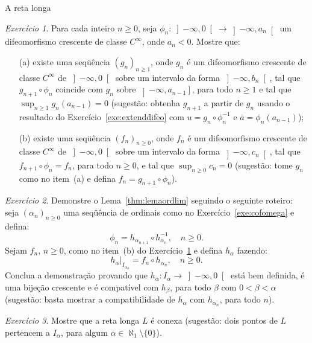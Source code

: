 \documentclass[oneside,11pt]{amsart}
\theoremstyle{remark}\newtheorem{exercise}{Exercício}[section]
\theoremstyle{plain}\newtheorem{teo}{Teorema}[section]
\theoremstyle{plain}\newtheorem{lem}[teo]{Lema}
\theoremstyle{plain}\newtheorem{prop}[teo]{Proposição}
\theoremstyle{definition}\newtheorem{defin}[teo]{Definição}
\theoremstyle{remark}\newtheorem{rem}[teo]{Observação}
\theoremstyle{definition}\newtheorem{example}[teo]{Exemplo}
\numberwithin{equation}{section}
\begin{document}
\begin{section}{A reta longa}
\begin{exercise}\label{exe:colagemintervalos}
Para cada inteiro $n\ge0$, seja $\phi_n:\left]-\infty,0\right[\to\left]-\infty,a_n\right[$ um difeomorfismo crescente de classe $C^\infty$, onde
$a_n<0$. Mostre que:
\begin{itemize}
\item[(a)] existe uma seqüência $(g_n)_{n\ge1}$, onde $g_n$ é um difeomorfismo crescente de classe $C^\infty$ de $\left]-\infty,0\right[$ sobre
um intervalo da forma $\left]-\infty,b_n\right[$, tal que $g_{n+1}\circ\phi_n$ coincide com $g_n$ sobre $\left]-\infty,a_{n-1}\right]$, para todo $n\ge1$
e tal que $\sup_{n\ge1}g_n(a_{n-1})=0$
(sugestão: obtenha $g_{n+1}$ a partir de $g_n$ usando o resultado do Exercício~\ref{exe:extenddifeo} com $u=g_n\circ\phi_n^{-1}$ e $\bar a=\phi_n(a_{n-1})$);
\item[(b)] existe uma seqüência $(f_n)_{n\ge0}$, onde $f_n$ é um difeomorfismo crescente de classe $C^\infty$ de $\left]-\infty,0\right[$ sobre
um intervalo da forma $\left]-\infty,c_n\right[$, tal que $f_{n+1}\circ\phi_n=f_n$, para todo $n\ge0$, e tal que $\sup_{n\ge0}c_n=0$
(sugestão: tome $g_n$ como no item~(a) e defina $f_n=g_{n+1}\circ\phi_n$).
\end{itemize}
\end{exercise}

\begin{exercise}
Demonstre o Lema~\ref{thm:lemaordlim} seguindo o seguinte roteiro: seja $(\alpha_n)_{n\ge0}$ uma seqüência de ordinais como no Exercício~\ref{exe:cofomega} e defina:
\[\phi_n=h_{\alpha_{n+1}}\circ h_{\alpha_n}^{-1},\quad n\ge0.\]
Sejam $f_n$, $n\ge0$, como no item~(b) do Exercício~\ref{exe:colagemintervalos} e defina $h_\alpha$ fazendo:
\[h_\alpha\vert_{I_{\alpha_n}}=f_n\circ h_{\alpha_n},\quad n\ge0.\]
Conclua a demonstração provando que $h_\alpha:I_\alpha\to\left]-\infty,0\right[$ está bem definida, é uma bijeção crescente e é compatível com $h_\beta$,
para todo $\beta$ com $0<\beta<\alpha$ (sugestão: basta mostrar a compatibilidade de $h_\alpha$ com $h_{\alpha_n}$, para todo $n$).
\end{exercise}

\begin{exercise}
Mostre que a reta longa $L$ é conexa (sugestão: dois pontos de $L$ pertencem a $I_\alpha$, para algum $\alpha\in\aleph_1\setminus\{0\}$).
\end{exercise}

\end{section}
\end{document}
